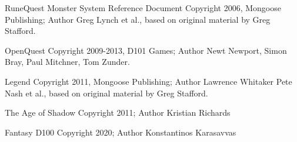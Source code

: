 \begin{scriptsize}
\noindent RuneQuest Monster System Reference Document Copyright 2006, Mongoose Publishing; Author Greg Lynch et al., based on original material by Greg Stafford.

\noindent OpenQuest Copyright 2009-2013, D101 Games; Author Newt Newport, Simon Bray, Paul Mitchner, Tom Zunder.

\noindent Legend Copyright 2011, Mongoose Publishing; Author Lawrence Whitaker Pete Nash et al., based on original material by Greg Stafford.

\noindent The Age of Shadow Copyright 2011; Author Kristian Richards

\noindent Fantasy D100 Copyright 2020; Author Konstantinos Karasavvas
\end{scriptsize}
